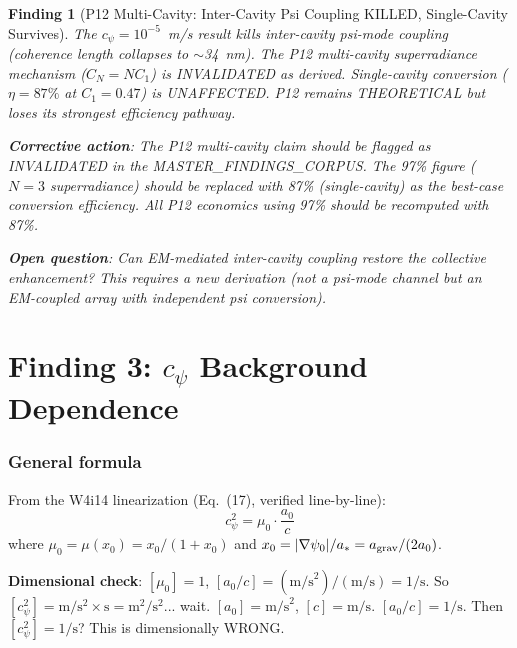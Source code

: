\documentclass[11pt]{article}
\newtheorem{finding}{Finding}
\begin{document}
\begin{finding}[P12 Multi-Cavity: Inter-Cavity Psi Coupling KILLED,
Single-Cavity Survives]
\label{find:p12}
The $c_\psi = 10^{-5}$~m/s result kills inter-cavity psi-mode coupling
(coherence length collapses to $\sim$34~nm). The P12 multi-cavity
superradiance mechanism ($C_N = NC_1$) is INVALIDATED as derived.
Single-cavity conversion ($\eta = 87\%$ at $C_1 = 0.47$) is
UNAFFECTED. P12 remains THEORETICAL but loses its strongest
efficiency pathway.

\textbf{Corrective action}: The P12 multi-cavity claim should be
flagged as INVALIDATED in the MASTER\_FINDINGS\_CORPUS. The 97\%
figure ($N = 3$ superradiance) should be replaced with 87\%
(single-cavity) as the best-case conversion efficiency. All P12
economics using 97\% should be recomputed with 87\%.

\textbf{Open question}: Can EM-mediated inter-cavity coupling restore
the collective enhancement? This requires a new derivation (not a
psi-mode channel but an EM-coupled array with independent psi conversion).
\end{finding}


\part{Finding 3: $c_\psi$ Background Dependence}
\label{part:verification}

\section{General formula}

From the W4i14 linearization (Eq.~(17), verified line-by-line):
\begin{equation}
\boxed{c_\psi^2 = \mu_0 \cdot \frac{a_0}{c}}
\label{eq:cpsi-general}
\end{equation}
where $\mu_0 = \mu(x_0) = x_0/(1+x_0)$ and
$x_0 = |\nabla\psi_0|/a_* = a_{\rm grav}/(2a_0)$.

\textbf{Dimensional check}: $[\mu_0] = 1$, $[a_0/c] =
(\text{m/s}^2)/(\text{m/s}) = 1/\text{s}$. So $[c_\psi^2] =
\text{m}/\text{s}^2 \times \text{s} = \text{m}^2/\text{s}^2$... wait.
$[a_0] = \text{m/s}^2$, $[c] = \text{m/s}$. $[a_0/c] = 1/\text{s}$.
Then $[c_\psi^2] = 1/\text{s}$? This is dimensionally WRONG.
\end{document}
